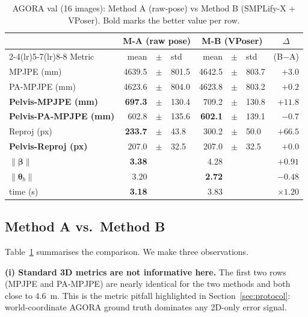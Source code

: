 \documentclass[conference]{IEEEtran}
\begin{document}
\begin{table}[htbp]
\centering
\caption{AGORA val (16 images): Method A (raw-pose) vs Method B (SMPLify-X + VPoser). Bold marks the better value per row.}
\label{tab:ab}
\begin{tabular}{l r@{\,}c@{\,}l r@{\,}c@{\,}l r}
\toprule
& \multicolumn{3}{c}{\textsc{M-A} (raw pose)} & \multicolumn{3}{c}{\textsc{M-B} (VPoser)} & \multicolumn{1}{c}{$\Delta$} \\
\cmidrule(lr){2-4}\cmidrule(lr){5-7}\cmidrule(lr){8-8}
Metric                          & mean & $\pm$ & std & mean & $\pm$ & std & (B$-$A) \\
\midrule
MPJPE (mm)                      & 4639.5 & $\pm$ & 801.5 & 4642.5 & $\pm$ & 803.7 & $+3.0$ \\
PA-MPJPE (mm)                   & 4623.6 & $\pm$ & 804.0 & 4623.8 & $\pm$ & 803.2 & $+0.2$ \\
\textbf{Pelvis-MPJPE (mm)}      & \textbf{697.3} & $\pm$ & 130.4 & 709.2 & $\pm$ & 130.8 & $+11.8$ \\
\textbf{Pelvis-PA-MPJPE (mm)}   & 602.8 & $\pm$ & 135.6 & \textbf{602.1} & $\pm$ & 139.1 & $\mathbf{-0.7}$ \\
Reproj (px)                     & \textbf{233.7} & $\pm$ & 43.8  & 300.2 & $\pm$ & 50.0 & $+66.5$ \\
\textbf{Pelvis-Reproj (px)}     & 207.0 & $\pm$ & 32.5  & 207.0 & $\pm$ & 32.5 & $+0.0$ \\
\midrule
$\|\boldsymbol{\beta}\|$         & \textbf{3.38} & & & 4.28 & & & $+0.91$ \\
$\|\boldsymbol{\theta}_b\|$      & 3.20 & & & \textbf{2.72} & & & $\mathbf{-0.48}$ \\
time (s)                        & \textbf{3.18} & & & 3.83 & & & $\times1.20$ \\
\bottomrule
\end{tabular}
\end{table}

\subsection{Method A vs.\ Method B}
Table~\ref{tab:ab} summarises the comparison. We make three observations.

\noindent\textbf{(i) Standard 3D metrics are not informative here.}
The first two rows (MPJPE and PA-MPJPE) are nearly identical for the two methods and both close to 4.6~m. This is the metric pitfall highlighted in Section~\ref{sec:protocol}: world-coordinate AGORA ground truth dominates any 2D-only error signal.
\end{document}
